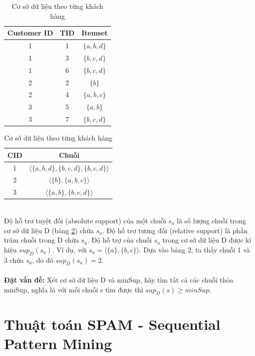 \documentclass[a4paper 14pt]{article}
\begin{document}
		\begin{table}[H]
			\begin{minipage}[t]{0.5\linewidth}
				\centering
				\begin{tabular}{|c | c | c|}
					\hline
					Customer ID & TID & Itemset\\ \hline
					1 & 1 & $\{a, b, d\}$\\ \hline
					1 & 3 & $\{b, c, d\}$\\ \hline
					1 & 6 & $\{b, c, d\}$\\ \hline
					2 & 2 & $\{b\}$\\ \hline
					2 & 4 & $\{a, b, c\}$\\ \hline
					3 & 5 & $\{a, b\}$\\ \hline
					3 & 7 & $\{b, c, d\}$\\ \hline
				\end{tabular}
				\caption{Cơ sở dữ liệu sắp xếp theo CID và TID}
				\label{table:type1}
			\end{minipage}%
			\begin{minipage}[t]{0.5\linewidth}
				\centering
				\begin{tabular}{| c | c |}
					\hline
					CID & Chuỗi\\ \hline
					1 & $\langle \{a, b, d\}, \{b, c, d\}, \{b, c, d\}\rangle$\\ \hline
					2 & $\langle \{b\}, \{a, b, c\} \rangle$\\ \hline
					3 & $\langle \{a, b\}, \{b, c, d\} \rangle$\\ \hline
				\end{tabular}
				\caption{Cơ sở dữ liệu theo từng khách hàng}
				\label{table:type2}
			\end{minipage}%
		\end{table}$~$\\
		Độ hỗ trơ tuyệt đối (absolute support) của một chuỗi $s_a$ là số lượng chuỗi trong cơ sở dữ liệu D (bảng \ref{table:type2}) chứa $s_a$. Độ hỗ trợ tương đối (relative support) là phần trăm chuỗi trong D chứa $s_a$. Độ hỗ trợ của chuỗi $s_a$ trong cơ sở dữ liệu D được kí hiệu $sup_D(s_a)$. Ví dụ, với $s_a = \langle \{a\}, \{b,c\} \rangle$. Dựa vào bảng 2, ta thấy chuỗi 1 và 3 chứa $s_a$, do đó $sup_D(s_a) = 2$.\\
		$~$\\
		\textbf{Đặt vấn đề:} Xét cơ sở dữ liệu D và minSup, hãy tìm tất cả các chuỗi thỏa minSup, nghĩa là với mỗi chuỗi s tìm được thì $sup_D(s) \geq minSup$.
		
	\section{Thuật toán SPAM - Sequential Pattern Mining}
\end{document}
